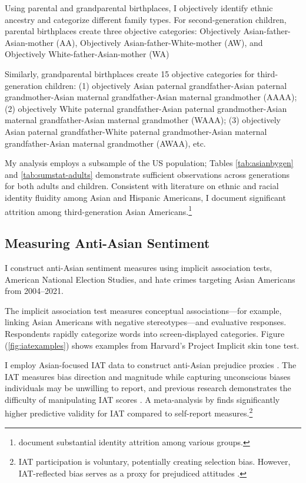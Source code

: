 \documentclass[12pt,english]{article}
\begin{document}
Using parental and grandparental birthplaces, I objectively identify ethnic ancestry and categorize different family types. For second-generation children, parental birthplaces create three objective categories: Objectively Asian-father-Asian-mother (AA), Objectively Asian-father-White-mother (AW), and Objectively White-father-Asian-mother (WA)

Similarly, grandparental birthplaces create 15 objective categories for third-generation children: (1) objectively Asian paternal grandfather-Asian paternal grandmother-Asian maternal grandfather-Asian maternal grandmother (AAAA); (2) objectively White paternal grandfather-Asian paternal grandmother-Asian maternal grandfather-Asian maternal grandmother (WAAA); (3) objectively Asian paternal grandfather-White paternal grandmother-Asian maternal grandfather-Asian maternal grandmother (AWAA), etc.

My analysis employs a subsample of the US population; Tables \ref{tab:asianbygen} and \ref{tab:sumstat-adults} demonstrate sufficient observations across generations for both adults and children. Consistent with literature on ethnic and racial identity fluidity among Asian and Hispanic Americans, I document significant attrition among third-generation Asian Americans.\footnote{\textcite{duncanIdentifyingLaterGenerationDescendants2018,duncanSocioeconomicIntegrationImmigrant2018, antmanEthnicAttritionObserved2016,antmanEthnicAttritionAssimilation2020} document substantial identity attrition among various groups.}

\subsection{Measuring Anti-Asian Sentiment}\label{sub:lw-bias}

I construct anti-Asian sentiment measures using implicit association tests, American National Election Studies, and hate crimes targeting Asian Americans from 2004--2021. 

The implicit association test measures conceptual associations---for example, linking Asian Americans with negative stereotypes---and evaluative responses. Respondents rapidly categorize words into screen-displayed categories. Figure (\ref{fig:iatexamples}) shows examples from Harvard's Project Implicit skin tone test.

I employ Asian-focused IAT data to construct anti-Asian prejudice proxies \autocite{greenwaldMeasuringIndividualDifferences1998}. The IAT measures bias direction and magnitude while capturing unconscious biases individuals may be unwilling to report, and previous research demonstrates the difficulty of manipulating IAT scores \autocite{egloffPredictiveValidityImplicit2002}. A meta-analysis by \textcite{greenwaldMeasuringIndividualDifferences1998} finds significantly higher predictive validity for IAT compared to self-report measures.\footnote{IAT participation is voluntary, potentially creating selection bias. However, IAT-reflected bias serves as a proxy for prejudiced attitudes \autocite{chettyRaceEconomicOpportunity2020}.} 
\end{document}
